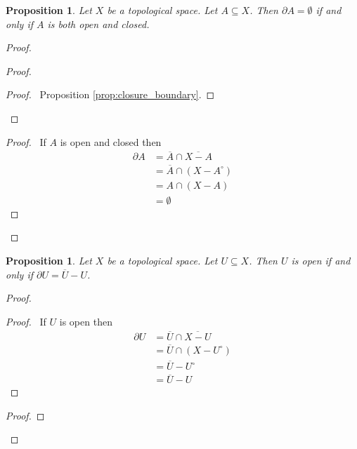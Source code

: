 \documentclass{book}
\let\qed\relax
\newtheorem{prop}[ax]{Proposition}
\theoremstyle{definition}
\begin{document}
\begin{prop}
Let $X$ be a topological space. Let $A \subseteq X$. Then $\partial A = \emptyset$ if and only if $A$ is both open and closed.
\end{prop}

\begin{proof}
\pf
{}
\begin{proof}
	\begin{proof}
		\pf\ Proposition \ref{prop:closure_boundary}.
	\end{proof}
\end{proof}
\begin{proof}
	\pf\ If $A$ is open and closed then
	\begin{align*}
	\partial A & = \overline{A} \cap \overline{X-A} \\
	& = \overline{A} \cap (X - A^\circ) \\
	& = A \cap (X - A) \\
	& = \emptyset
	\end{align*}
\end{proof}
\qed
\end{proof}

\begin{prop}
Let $X$ be a topological space. Let $U \subseteq X$. Then $U$ is open if and only if $\partial U = \overline{U} - U$.
\end{prop}

\begin{proof}
\pf
{}
\begin{proof}
	\pf\ If $U$ is open then
	\begin{align*}
		\partial U & = \overline{U} \cap \overline{X-U} \\
		& = \overline{U} \cap (X - U^\circ) \\
		& = \overline{U} - U^\circ \\
		& = \overline{U} - U 
	\end{align*}
\end{proof}
\begin{proof}
\end{proof}
\qed
\end{proof}
\end{document}
